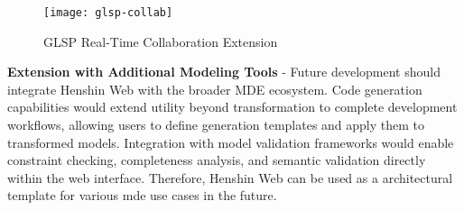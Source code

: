   \begin{figure}
    \centering
    \texttt{[image: glsp-collab]}
    \caption{GLSP Real-Time Collaboration Extension \cite{glsp-collab}}
    \label{fig:glsp-collaboration}
  \end{figure}

  \textbf{Extension with Additional Modeling Tools} - Future development should integrate Henshin Web with the broader MDE ecosystem. Code generation capabilities would extend utility beyond transformation to complete development workflows, allowing users to define generation templates and apply them to transformed models. Integration with model validation frameworks would enable constraint checking, completeness analysis, and semantic validation directly within the web interface. Therefore, Henshin Web can be used as a architectural template for various \ac{mde} use cases in the future.